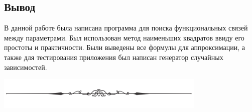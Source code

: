 \newpage
\subsection*{Вывод\\}

В данной работе была написана программа для поиска функциональных связей между параметрами. Был использован метод наименьших квадратов ввиду его простоты и практичности. Были выведены все формулы для аппроксимации, а также для тестирования приложения был написан генератор случайных зависимостей.

\vspace{0.5cm}

\begin{center}
    \includegraphics[width=0.75\textwidth]{Screenshots/line.png}
\end{center}